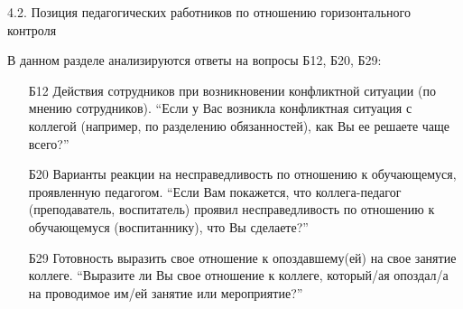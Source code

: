 \begin{frame}{4.2. Позиция педагогических работников по отношению горизонтального контроля}

\tiny

В данном разделе анализируются ответы на вопросы Б12, Б20, Б29:
\bigskip

\begin{itemize}

\item [Б12] Действия сотрудников при возникновении конфликтной ситуации (по мнению сотрудников). ``Если у Вас возникла конфликтная ситуация с коллегой (например, по разделению обязанностей), как Вы ее решаете чаще всего?''

\item [Б20] Варианты реакции на несправедливость по отношению к обучающемуся, проявленную педагогом. ``Если Вам покажется, что коллега-педагог (преподаватель, воспитатель) проявил несправедливость по отношению к обучающемуся (воспитаннику), что Вы сделаете?''

\item [Б29] Готовность выразить свое отношение к опоздавшему(ей) на свое занятие коллеге. ``Выразите ли Вы свое отношение к коллеге, который/ая опоздал/а на проводимое им/ей занятие или мероприятие?''

\end{itemize}

\end{frame}


